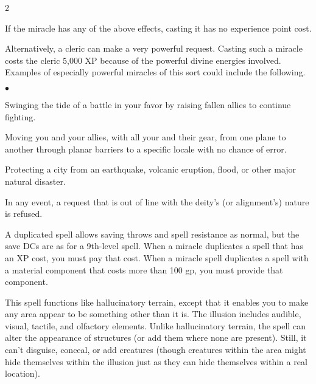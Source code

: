 \begin{multicols}{2}
\begin{small}
\smallskip\noindent If the miracle has any of the above effects, casting it has no experience point cost.

\smallskip\noindent Alternatively, a cleric can make a very powerful request. Casting such a miracle costs the cleric 5,000 XP because of the powerful divine energies involved. Examples of especially powerful miracles of this sort could include the following.

\begin{list}{$\bullet$}{\itemspace}
  \item Swinging the tide of a battle in your favor by raising fallen allies to continue fighting.
  \item Moving you and your allies, with all your and their gear, from one plane to another through planar barriers to a specific locale with no chance of error.
  \item Protecting a city from an earthquake, volcanic eruption, flood, or other major natural disaster.
\end{list}

\smallskip\noindent In any event, a request that is out of line with the deity's (or alignment's) nature is refused.

\smallskip\noindent A duplicated spell allows saving throws and spell resistance as normal, but the save DCs are as for a 9th-level spell. When a miracle duplicates a spell that has an XP cost, you must pay that cost. When a miracle spell duplicates a spell with a material component that costs more than 100 gp, you must provide that component.


\noindent This spell functions like hallucinatory terrain, except that it enables you to make any area appear to be something other than it is. The illusion includes audible, visual, tactile, and olfactory elements. Unlike hallucinatory terrain, the spell can alter the appearance of structures (or add them where none are present). Still, it can't disguise, conceal, or add creatures (though creatures within the area might hide themselves within the illusion just as they can hide themselves within a real location).


\end{small}
\end{multicols}
